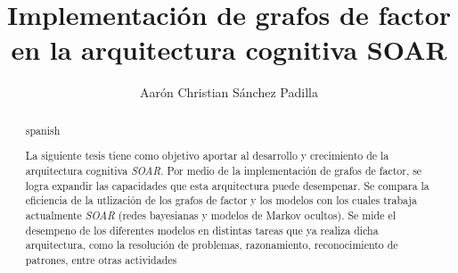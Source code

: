 \documentclass{tesisITAM}
\title{Implementaci\'{o}n de grafos de factor en la arquitectura cognitiva SOAR}
\author{Aarón Christian Sánchez Padilla}
\begin{document}
	\maketitle
	\publicationrights


	\begin{abstract}{spanish}
	
	La siguiente tesis tiene como objetivo aportar al desarrollo y crecimiento de la arquitectura cognitiva \emph{SOAR}. Por medio de la implementaci\'{o}n de grafos de factor, se logra expandir las capacidades que esta arquitectura puede desempe{n}ar. Se compara la eficiencia de la utlizaci\'{o}n de los grafos de factor y los modelos con los cuales trabaja actualmente \emph{SOAR} (redes bayesianas y modelos de Markov ocultos). Se mide el desempeno de los diferentes modelos en distintas tareas que ya realiza dicha arquitectura, como la resoluci\'{o}n de problemas, razonamiento, reconocimiento de patrones, entre otras actividades 
	\end{abstract}



	\setcounter{page}{1}

	\tableofcontents
	\newpage

	\setcounter{page}{1}


	
	
	

	\appendix

	\clearpage
	
	{}
	
	
\end{document}
